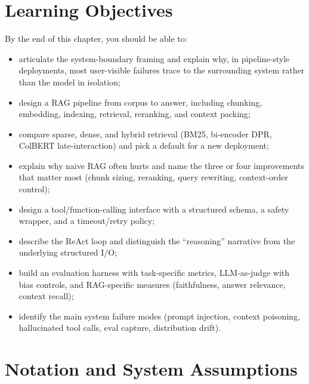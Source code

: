 \section{Learning Objectives}

By the end of this chapter, you should be able to:
\begin{itemize}
  \item articulate the system-boundary framing and explain why,
        in pipeline-style deployments, most user-visible failures
        trace to the surrounding system rather than the model in
        isolation;
  \item design a RAG pipeline from corpus to answer, including
        chunking, embedding, indexing, retrieval, reranking, and
        context packing;
  \item compare sparse, dense, and hybrid retrieval (BM25,
        bi-encoder DPR, ColBERT late-interaction) and pick a
        default for a new deployment;
  \item explain why naive RAG often hurts and name the three or
        four improvements that matter most (chunk sizing,
        reranking, query rewriting, context-order control);
  \item design a tool/function-calling interface with a structured
        schema, a safety wrapper, and a timeout/retry policy;
  \item describe the ReAct loop and distinguish the ``reasoning''
        narrative from the underlying structured I/O;
  \item build an evaluation harness with task-specific metrics,
        LLM-as-judge with bias controls, and RAG-specific measures
        (faithfulness, answer relevance, context recall);
  \item identify the main system failure modes (prompt injection,
        context poisoning, hallucinated tool calls, eval capture,
        distribution drift).
\end{itemize}

\section{Notation and System Assumptions}

